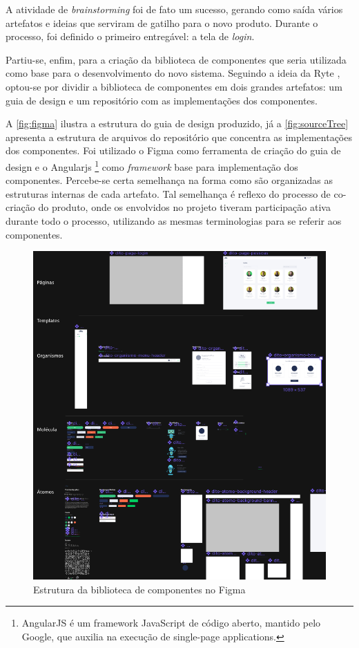 A atividade de \textit{brainstorming} foi de fato um sucesso, gerando como saída vários artefatos e ideias que serviram de gatilho para o novo produto. Durante o processo, foi definido o primeiro entregável: a tela de \textit{login}.

Partiu-se, enfim, para a criação da biblioteca de componentes que seria utilizada como base para o desenvolvimento do novo sistema. Seguindo a ideia da Ryte \cite{ryteDesignSystem}, optou-se por dividir a biblioteca de componentes em dois grandes artefatos: um guia de design e um repositório com as implementações dos componentes.

A \autoref{fig:figma} ilustra a estrutura do guia de design produzido, já a \autoref{fig:sourceTree} apresenta a estrutura de arquivos do repositório que concentra as implementações dos componentes. Foi utilizado o Figma como ferramenta de criação do guia de design e o Angularjs \footnote{AngularJS é um framework JavaScript de código aberto, mantido pelo Google, que auxilia na execução de single-page applications.} como \textit{framework} base para implementação dos componentes. Percebe-se certa semelhança na forma como são organizadas as estruturas internas de cada artefato. Tal semelhança é reflexo do processo de co-criação do produto, onde os envolvidos no projeto tiveram participação ativa durante todo o processo, utilizando as mesmas terminologias para se referir aos componentes.

\begin{figure}
	\includegraphics[width=\linewidth]{./04-figuras/06_biblioteca_componentes/styleguide-figma.png}
  \caption{Estrutura da biblioteca de componentes no Figma}
  \label{fig:figma}
\end{figure}

